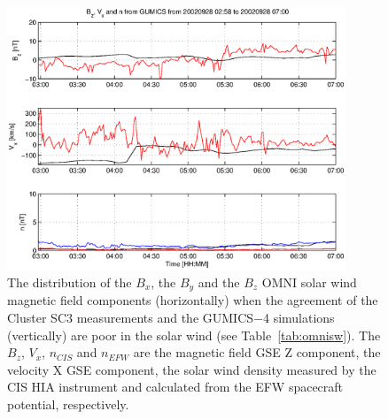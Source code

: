 \documentclass[linenumbers,draft]{agujournal}
\begin{document}
\begin{figure}[h]
\centering
\includegraphics[width=0.9\textwidth,angle=0]{swe-2020-corr-f13.eps}  
\caption{The distribution of the $B_{x}$, the $B_{y}$ and the $B_{z}$ OMNI solar wind magnetic field components (horizontally) when the agreement of the Cluster SC3 measurements and the GUMICS$-$4 simulations (vertically) are poor in the solar wind (see Table~\ref{tab:omnisw}). The $B_{z}$, $V_{x}$, $n_{CIS}$ and $n_{EFW}$ are the magnetic field GSE Z component, the velocity X GSE component, the solar wind density measured by the CIS HIA instrument and calculated from the EFW spacecraft potential, respectively.}
\label{fig:swomnibxyz}
\end{figure}

\pagebreak
\end{document}
